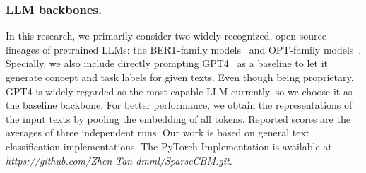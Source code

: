 \documentclass[letterpaper]{article} %
\begin{document}
\subsubsection{LLM backbones.}
In this research, we primarily consider two widely-recognized, open-source lineages of pretrained LLMs: the BERT-family models~\cite{devlin2018bert,liu2019roberta,sanh2019distilbert} and OPT-family models~\cite{zhang2022opt}. Specially, we also include directly prompting GPT4~\cite{openai2023gpt4} as a baseline to let it generate concept and task labels for given texts.
Even though being proprietary, GPT4 is widely regarded as the most capable LLM currently, so we choose it as the baseline backbone. For better performance, we obtain the representations of the input texts by pooling the embedding of all tokens. Reported scores are the averages of three independent runs. Our work is based on general text classification implementations. The PyTorch Implementation is available at \textit{https://github.com/Zhen-Tan-dmml/SparseCBM.git}. 
\end{document}
